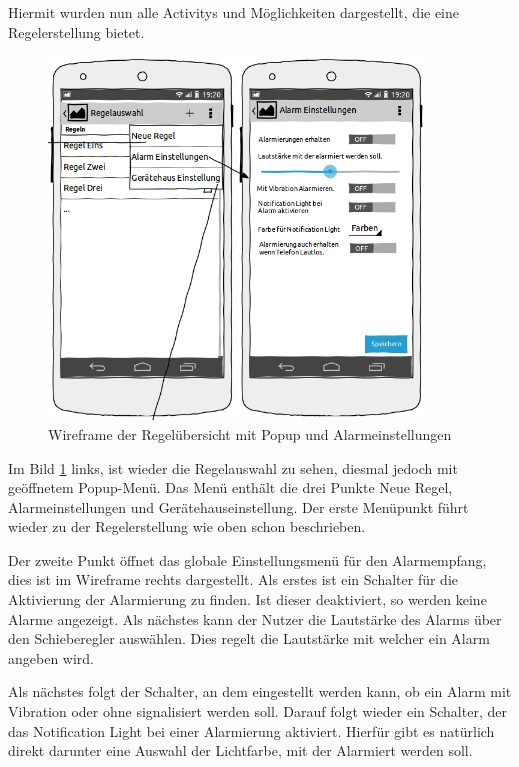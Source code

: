 Hiermit wurden nun alle Activitys und M\"oglichkeiten dargestellt, die eine Regelerstellung bietet.
\newpage

\begin{figure}
\vspace{-13pt}
\includegraphics[width=10cm]{Bilder/WireframeRegeluebersicht_popup.png}
\caption{Wireframe der Regel\"ubersicht mit Popup und Alarmeinstellungen}
\label{Wireframe Regeluebersicht Popup}
\vspace{-20pt}
\end{figure}
Im Bild \ref{Wireframe Regeluebersicht Popup} links, ist wieder die Regelauswahl zu sehen, diesmal jedoch mit ge\"offnetem Popup-Men\"u. Das Men\"u enth\"alt die drei Punkte Neue Regel, Alarmeinstellungen und Ger\"atehauseinstellung. Der erste Men\"upunkt f\"uhrt wieder zu der Regelerstellung wie oben schon beschrieben. 

Der zweite Punkt \"offnet das globale Einstellungsmen\"u f\"ur den Alarmempfang, dies ist im Wireframe rechts dargestellt. Als erstes ist ein Schalter f\"ur die Aktivierung der Alarmierung zu finden. Ist dieser deaktiviert, so werden keine Alarme angezeigt. Als n\"achstes kann der Nutzer die Lautst\"arke des Alarms \"uber den Schieberegler ausw\"ahlen. Dies regelt die Lautst\"arke mit welcher ein Alarm angeben wird.

Als n\"achstes folgt der Schalter, an dem eingestellt werden kann, ob ein Alarm mit Vibration oder ohne signalisiert werden soll. Darauf folgt wieder ein Schalter, der das Notification Light bei einer Alarmierung aktiviert. Hierf\"ur gibt es nat\"urlich direkt darunter eine Auswahl der Lichtfarbe, mit der Alarmiert werden soll.

